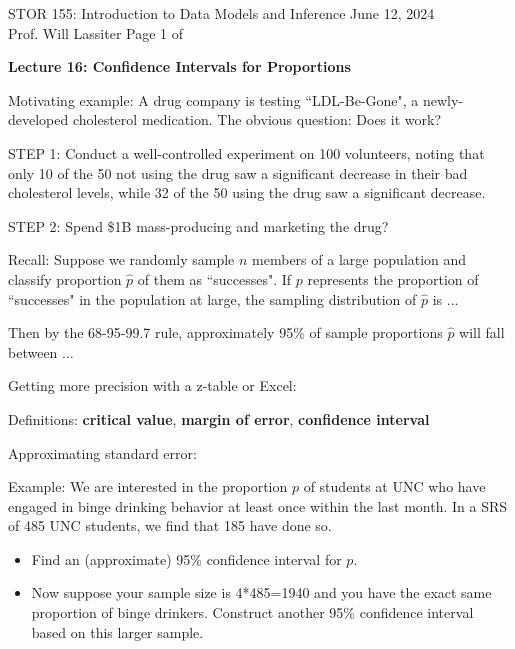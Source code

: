 \documentclass[11pt,letterpaper,twoside]{article}
\newcommand{\whatizit}{Lecture 16: Confidence Intervals for Proportions}
\begin{document}
\thispagestyle{empty} \vspace*{-0.75in}

{\bssten STOR 155: Introduction to Data Models and Inference \hfill June 12, 2024 \\
Prof. Will Lassiter  \hfill Page 1 of \pageref{totalpag}}
\vspace{10pt}
\begin{center} {{\Large \bf \whatizit}} \end{center}

Motivating example: A drug company is testing ``LDL-Be-Gone", a newly-developed cholesterol medication. The obvious question:  Does it work? \vspace{10pt}

STEP 1: Conduct a well-controlled experiment on 100 volunteers, noting that only 10 of the 50 not using the drug saw a significant decrease in their bad cholesterol levels, while 32 of the 50 using the drug saw a significant decrease. \vspace{10pt}

STEP 2: Spend \$1B mass-producing and marketing the drug? \vspace{120pt}


Recall: Suppose we randomly sample $n$ members of a large population and classify proportion $\hat{p}$ of them as ``successes".  If $p$ represents the proportion of ``successes" in the population at large, the sampling distribution of $\hat{p}$ is ... \vspace{60pt}

Then by the 68-95-99.7 rule, approximately 95\% of sample proportions $\hat{p}$ will fall between ... 

\newpage

Getting more precision with a z-table or Excel: \vspace{200pt}

Definitions: {\bf critical value}, {\bf margin of error}, {\bf confidence interval} \vspace{350pt}

Approximating standard error:

\newpage

Example: We are interested in the proportion $p$ of students at UNC who have engaged in binge drinking behavior at least once within the last month. In a SRS of 485 UNC students, we find that 185 have done so.  

\begin{itemize}

\item Find an (approximate) 95\% confidence interval for $p$. \vspace{120pt}

\item Now suppose your sample size is 4*485=1940 and you have the exact same proportion of binge drinkers.  Construct another 95\% confidence interval based on this larger sample. \vspace{80pt}

\end{itemize}
\end{document}
